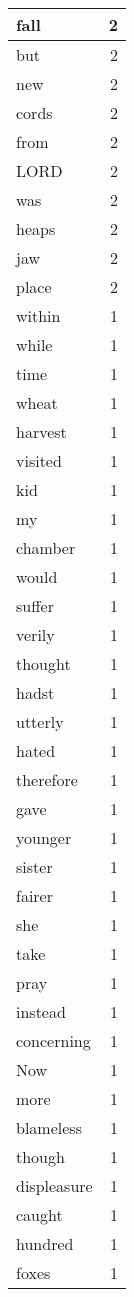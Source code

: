 \begin{center}
\begin{longtable}{l|r}
fall & 2\\ \hline 
but & 2\\ \hline 
new & 2\\ \hline 
cords & 2\\ \hline 
from & 2\\ \hline 
LORD & 2\\ \hline 
was & 2\\ \hline 
heaps & 2\\ \hline 
jaw & 2\\ \hline 
place & 2\\ \hline 
within & 1\\ \hline 
while & 1\\ \hline 
time & 1\\ \hline 
wheat & 1\\ \hline 
harvest & 1\\ \hline 
visited & 1\\ \hline 
kid & 1\\ \hline 
my & 1\\ \hline 
chamber & 1\\ \hline 
would & 1\\ \hline 
suffer & 1\\ \hline 
verily & 1\\ \hline 
thought & 1\\ \hline 
hadst & 1\\ \hline 
utterly & 1\\ \hline 
hated & 1\\ \hline 
therefore & 1\\ \hline 
gave & 1\\ \hline 
younger & 1\\ \hline 
sister & 1\\ \hline 
fairer & 1\\ \hline 
she & 1\\ \hline 
take & 1\\ \hline 
pray & 1\\ \hline 
instead & 1\\ \hline 
concerning & 1\\ \hline 
Now & 1\\ \hline 
more & 1\\ \hline 
blameless & 1\\ \hline 
though & 1\\ \hline 
displeasure & 1\\ \hline 
caught & 1\\ \hline 
hundred & 1\\ \hline 
foxes & 1\\ \hline 

\end{longtable}
\end{center}
